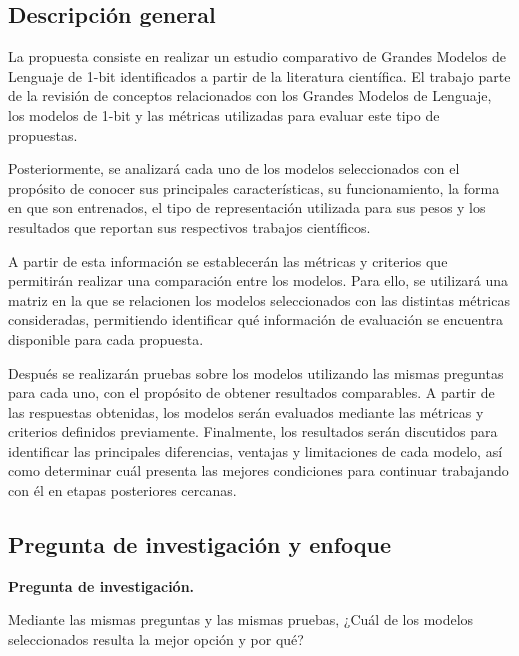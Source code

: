 \subsection{Descripción general}

La propuesta consiste en realizar un estudio comparativo de Grandes Modelos de Lenguaje de 1-bit identificados a partir de la literatura científica. El trabajo parte de la revisión de conceptos relacionados con los Grandes Modelos de Lenguaje, los modelos de 1-bit y las métricas utilizadas para evaluar este tipo de propuestas.

Posteriormente, se analizará cada uno de los modelos seleccionados con el propósito de conocer sus principales características, su funcionamiento, la forma en que son entrenados, el tipo de representación utilizada para sus pesos y los resultados que reportan sus respectivos trabajos científicos.

A partir de esta información se establecerán las métricas y criterios que permitirán realizar una comparación entre los modelos. Para ello, se utilizará una matriz en la que se relacionen los modelos seleccionados con las distintas métricas consideradas, permitiendo identificar qué información de evaluación se encuentra disponible para cada propuesta.

Después se realizarán pruebas sobre los modelos utilizando las mismas preguntas para cada uno, con el propósito de obtener resultados comparables. A partir de las respuestas obtenidas, los modelos serán evaluados mediante las métricas y criterios definidos previamente. Finalmente, los resultados serán discutidos para identificar las principales diferencias, ventajas y limitaciones de cada modelo, así como determinar cuál presenta las mejores condiciones para continuar trabajando con él en etapas posteriores cercanas.


\subsection{Pregunta de investigación y enfoque}

\textbf{Pregunta de investigación.}

Mediante las mismas preguntas y las mismas pruebas, ¿Cuál de los modelos seleccionados resulta la mejor opción y por qué?

